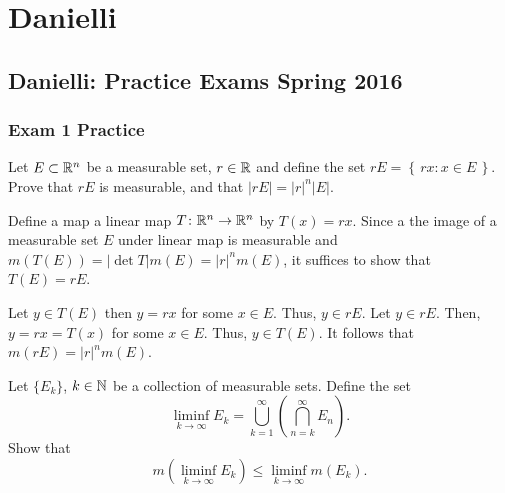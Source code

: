 \section{Danielli}
\subsection{Danielli: Practice Exams Spring 2016}
\setcounter{exercise}{0}
\setcounter{equation}{0}

\subsubsection{Exam 1 Practice}
\begin{problem}
  Let $E\subset\mathbb{R}^n$ be a measurable set, $r\in\mathbb{R}$ and define the set
  $rE=\left\{\,rx : x\in E\,\right\}$. Prove that $rE$ is measurable, and
  that $|rE|=|r|^n|E|$.
\end{problem}
\begin{solution}
  Define a map a linear map $T\colon\mathbb{R}^n\to\mathbb{R}^n$ by $T(x)=rx$. Since a
  the image of a measurable set $E$ under linear map is measurable and
  $m(T(E))=|{\det T}|m(E)=|r|^nm(E)$, it suffices to show that $T(E)=rE$.

  Let $y\in T(E)$ then $y=rx$ for some $x\in E$. Thus, $y\in rE$. Let $y\in
  rE$. Then, $y=rx=T(x)$ for some $x\in E$. Thus, $y\in T(E)$. It follows
  that $m(rE)=|r|^nm(E)$.
\end{solution}

\begin{problem}
  Let $\{E_k\}$, $k\in\mathbb{N}$ be a collection of measurable sets. Define the
  set
  \[
    \liminf_{k\to\infty} E_k
    =\bigcup_{k=1}^\infty\left(\bigcap_{n=k}^\infty E_n\right).
  \]
  Show that
  \[
    m\left(\liminf_{k\to\infty}
      E_k\right)\leq\liminf_{k\to\infty}m(E_k).
  \]
\end{problem}

